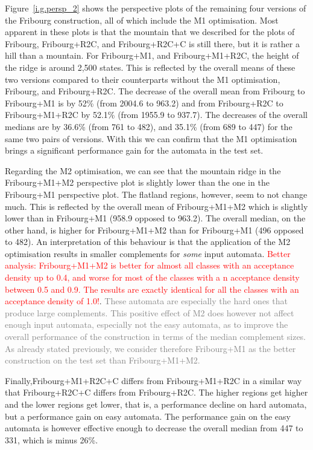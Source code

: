 Figure~\ref{i.g.persp_2} shows the perspective plots of the remaining four versions of the Fribourg construction, all of which include the M1 optimisation. Most apparent in these plots is that the mountain that we described for the plots of Fribourg, Fribourg+R2C, and Fribourg+R2C+C is still there, but it is rather a hill than a mountain. For Fribourg+M1, and Fribourg+M1+R2C, the height of the ridge is around 2,500 states. This is reflected by the overall means of these two versions compared to their counterparts without the M1 optimisation, Fribourg, and Fribourg+R2C. The decrease of the overall mean from Fribourg to Fribourg+M1 is by 52\% (from 2004.6 to 963.2) and from Fribourg+R2C to Fribourg+M1+R2C by 52.1\% (from 1955.9 to 937.7). The decreases of the overall medians are by 36.6\% (from 761 to 482), and 35.1\% (from 689 to 447) for the same two pairs of versions. With this we can confirm that the M1 optimisation brings a significant performance gain for the automata in the \goal{} test set.

Regarding the M2 optimisation, we can see that the mountain ridge in the Fribourg+M1+M2 perspective plot is slightly lower than the one in the Fribourg+M1 perspective plot. The flatland regions, however, seem to not change much. This is reflected by the overall mean of Fribourg+M1+M2 which is slightly lower than in Fribourg+M1 (958.9 opposed to 963.2). The overall median, on the other hand, is higher for Fribourg+M1+M2 than for Fribourg+M1 (496 opposed to 482). An interpretation of this behaviour is that the application of the M2 optimisation results in smaller complements for \textit{some} input automata. \textcolor{red}{Better analysis: Fribourg+M1+M2 is better for almost all classes with an acceptance density up to 0.4, and worse for most of the classes with a n acceptance density between 0.5 and 0.9. The results are exactly identical for all the classes with an acceptance density of 1.0!}. \textcolor{gray}{These automata are especially the hard ones that produce large complements. This positive effect of M2 does however not affect enough input automata, especially not the easy automata, as to improve the overall performance of the construction in terms of the median complement sizes. As already stated previously, we consider therefore Fribourg+M1 as the better construction on the \goal{} test set than Fribourg+M1+M2.}

Finally,Fribourg+M1+R2C+C differs from Fribourg+M1+R2C in a similar way that Fribourg+R2C+C differs from Fribourg+R2C. The higher regions get higher and the lower regions get lower, that is, a performance decline on hard automata, but a performance gain on easy automata. The performance gain on the easy automata is however effective enough to decrease the overall median from 447 to 331, which is minus 26\%.

